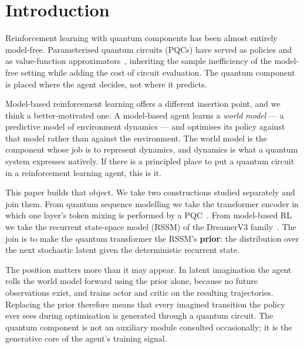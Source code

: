 \documentclass[11pt,onecolumn]{article}
\begin{document}
\begin{abstract}
Both circuits were executed on IonQ Forte-1, where measured
parameter-shift gradients agree with exact simulation. We also quantify
a design constraint for any hardware implementation: at ten qubits the
two standard entangling topologies differ by a factor of $2{,}766$ in
the shots needed to resolve a gradient. We release the architecture,
the verification harness and all run records.
\end{abstract}

\vspace{1em}

\section{Introduction}
Reinforcement learning with quantum components has been almost entirely
model-free. Parameterised quantum circuits (PQCs) have served as
policies and as value-function approximators~\cite{chen2020,skolik2023},
inheriting the sample inefficiency of the model-free setting while
adding the cost of circuit evaluation. The quantum component is placed
where the agent decides, not where it predicts.

Model-based reinforcement learning offers a different insertion point,
and we think a better-motivated one. A model-based agent learns a
\emph{world model} --- a predictive model of environment dynamics ---
and optimises its policy against that model rather than against the
environment. The world model is the component whose job is to represent
dynamics, and dynamics is what a quantum system expresses natively. If
there is a principled place to put a quantum circuit in a reinforcement
learning agent, this is it.

This paper builds that object. We take two constructions studied
separately and join them. From quantum sequence modelling we take the
transformer encoder in which one layer's token mixing is performed by a
PQC~\cite{qasa}. From model-based RL we take the recurrent state-space
model (RSSM) of the DreamerV3 family~\cite{hafner2023}. The join is to
make the quantum transformer the RSSM's \textbf{prior}: the distribution
over the next stochastic latent given the deterministic recurrent state.

The position matters more than it may appear. In latent imagination the
agent rolls the world model forward using the prior alone, because no
future observations exist, and trains actor and critic on the resulting
trajectories. Replacing the prior therefore means that every imagined
transition the policy ever sees during optimisation is generated through
a quantum circuit. The quantum component is not an auxiliary module
consulted occasionally; it is the generative core of the agent's
training signal.
\end{document}
